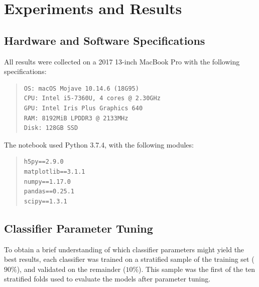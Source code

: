 \documentclass[11pt,a4paper]{article}
\begin{document}
\pagebreak

\section*{Experiments and Results}
\subsection*{Hardware and Software Specifications}
\noindent All results were collected on a 2017 13-inch MacBook Pro with the following specifications:
\begin{quote}
\begin{flushleft}
\begin{verbatim}
OS: macOS Mojave 10.14.6 (18G95)
CPU: Intel i5-7360U, 4 cores @ 2.30GHz 
GPU: Intel Iris Plus Graphics 640 
RAM: 8192MiB LPDDR3 @ 2133MHz 
Disk: 128GB SSD
\end{verbatim}
\end{flushleft}
\end{quote}
The notebook used Python 3.7.4, with the following modules:
\begin{quote}
\begin{flushleft}
\begin{verbatim}
h5py==2.9.0
matplotlib==3.1.1
numpy==1.17.0
pandas==0.25.1
scipy==1.3.1
\end{verbatim}
\end{flushleft}
\end{quote}

\subsection*{Classifier Parameter Tuning}
\noindent To obtain a brief understanding of which classifier parameters might yield the best results, each classifier was trained on a stratified sample of the training set ($90\%$), and validated on the remainder ($10\%$). This sample was the first of the ten stratified folds used to evaluate the models after parameter tuning.\\
\end{document}
